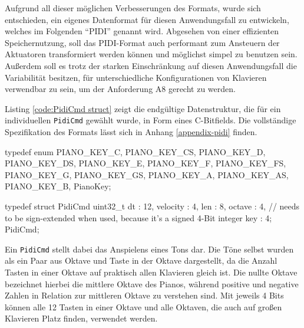 Aufgrund all dieser möglichen Verbesserungen des Formats, wurde sich entschieden, ein eigenes Datenformat für diesen Anwendungsfall zu entwickeln, welches im Folgenden \enquote{\ac{PIDI}} genannt wird.
Abgesehen von einer effizienten Speichernutzung, soll das \ac{PIDI}-Format auch performant zum Ansteuern der Aktuatoren transformiert werden können und möglichst simpel zu benutzen sein.
Außerdem soll es trotz der starken Einschränkung auf diesen Anwendungsfall die Variabilität besitzen, für unterschiedliche Konfigurationen von Klavieren verwendbar zu sein, um der Anforderung A8 gerecht zu werden.

Listing \ref{code:PidiCmd struct} zeigt die endgültige Datenstruktur, die für ein individuellen \lstinline{PidiCmd} gewählt wurde, in Form eines C-Bitfields.
Die vollständige Spezifikation des Formats lässt sich in Anhang \ref{appendix-pidi} finden.

\begin{UnbrokenCodePage}[style=CStyle, caption={Definition eines \ac{PIDI}-Kommands}, label={code:PidiCmd struct}]
typedef enum {
    PIANO_KEY_C,
    PIANO_KEY_CS,
    PIANO_KEY_D,
    PIANO_KEY_DS,
    PIANO_KEY_E,
    PIANO_KEY_F,
    PIANO_KEY_FS,
    PIANO_KEY_G,
    PIANO_KEY_GS,
    PIANO_KEY_A,
    PIANO_KEY_AS,
    PIANO_KEY_B,
} PianoKey;

typedef struct PidiCmd {
    uint32_t dt : 12,
    velocity    : 4,
    len         : 8,
    octave      : 4, // needs to be sign-extended when used, because it's a signed 4-Bit integer
    key         : 4;
} PidiCmd;
\end{UnbrokenCodePage}

Ein \lstinline{PidiCmd} stellt dabei das Anspielens eines Tons dar.
Die Töne selbst wurden als ein Paar aus Oktave und Taste in der Oktave dargestellt, da die Anzahl Tasten in einer Oktave auf praktisch allen Klavieren gleich ist.
Die nullte Oktave bezeichnet hierbei die mittlere Oktave des Pianos, während positive und negative Zahlen in Relation zur mittleren Oktave zu verstehen sind.
Mit jeweils 4 Bits können alle 12 Tasten in einer Oktave und alle Oktaven, die auch auf großen Klavieren Platz finden, verwendet werden.

